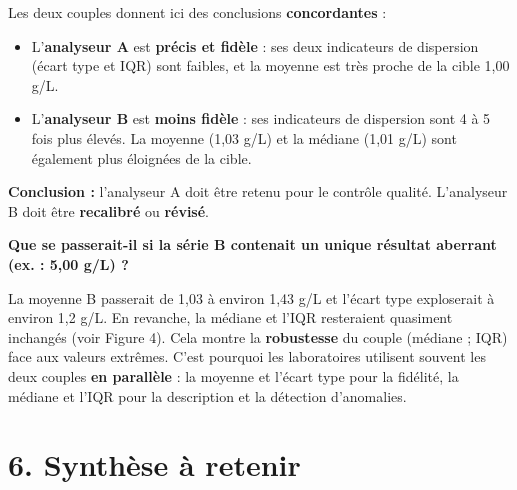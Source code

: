 \documentclass[11pt,a4paper]{article}
\begin{document}
\vspace{0.3cm}

\begin{interpretation}
Les deux couples donnent ici des conclusions \textbf{concordantes} :
\begin{itemize}[leftmargin=*]
  \item L'\textbf{analyseur A} est \textbf{précis et fidèle} : ses deux indicateurs de dispersion (écart type et IQR) sont faibles, et la moyenne est très proche de la cible 1,00 g/L.
  \item L'\textbf{analyseur B} est \textbf{moins fidèle} : ses indicateurs de dispersion sont 4 à 5 fois plus élevés. La moyenne (1,03 g/L) et la médiane (1,01 g/L) sont également plus éloignées de la cible.
\end{itemize}

\vspace{0.2cm}
\textbf{Conclusion :} l'analyseur A doit être retenu pour le contrôle qualité. L'analyseur B doit être \textbf{recalibré} ou \textbf{révisé}.
\end{interpretation}

\begin{attention}
\textbf{Que se passerait-il si la série B contenait un unique résultat aberrant (ex. : 5,00 g/L) ?}

\vspace{0.2cm}
La moyenne B passerait de 1,03 à environ 1,43 g/L et l'écart type exploserait à environ 1,2 g/L. En revanche, la médiane et l'IQR resteraient quasiment inchangés (voir Figure 4). Cela montre la \textbf{robustesse} du couple (médiane ; IQR) face aux valeurs extrêmes. C'est pourquoi les laboratoires utilisent souvent les deux couples \textbf{en parallèle} : la moyenne et l'écart type pour la fidélité, la médiane et l'IQR pour la description et la détection d'anomalies.
\end{attention}

\newpage

\section*{6. Synthèse à retenir}
\end{document}
